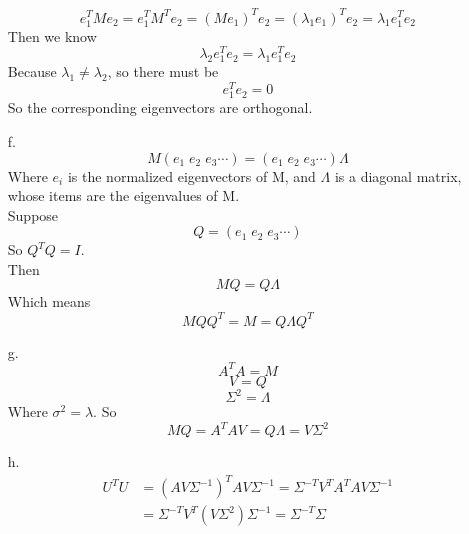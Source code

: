 \documentclass[10pt]{article}
\begin{document}
\begin{enumerate}
\begin{equation}
e_1^TMe_2=e_1^TM^Te_2=(Me_1)^Te_2=(\lambda_1e_1)^Te_2=\lambda_1e_1^Te_2
\end{equation}
Then we know \\
\begin{equation}
\lambda_2 e_1^Te_2=\lambda_1e_1^Te_2
\end{equation}
Because $\lambda_1\neq\lambda_2$, so there must be \\
\begin{equation}
e_1^Te_2=0
\end{equation}
So the corresponding eigenvectors are orthogonal. \\
\item[f.]
\begin{equation}
M(e_1\; e_2\; e_3 \dotsm)=(e_1\; e_2\; e_3 \dotsm)\Lambda
\end{equation}
Where $e_i$ is the normalized eigenvectors of M, and $\Lambda$ is a diagonal matrix, whose items are the eigenvalues of M.\\
Suppose \\
\begin{equation}
Q=(e_1\; e_2\; e_3 \dotsm)
\end{equation} 
So $Q^TQ=I$. \\
Then \\
\begin{equation}
MQ=Q\Lambda
\end{equation}
Which means \\
\begin{equation}
MQQ^T=M=Q\Lambda Q^T
\end{equation}
\item[g.]
\begin{equation}
A^TA=M
\end{equation}
\begin{equation}
V=Q
\end{equation}
\begin{equation}
\Sigma^2=\Lambda
\end{equation}
Where $\sigma^2=\lambda$.
So \\
\begin{equation}
MQ=A^TAV=Q\Lambda=V\Sigma^2
\end{equation}
\item[h.]
\begin{equation}
\begin{aligned}
U^TU&=(AV\Sigma^{-1})^TAV\Sigma^{-1}=\Sigma^{-T}V^TA^TAV\Sigma^{-1} \\
&=\Sigma^{-T}V^T(V\Sigma^2)\Sigma^{-1}=\Sigma^{-T}\Sigma
\end{aligned}

\end{equation}
\end{enumerate}
\end{document}

